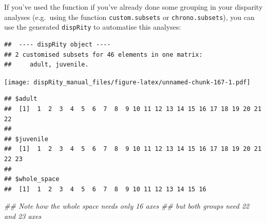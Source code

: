 \documentclass[
]{book}
\newenvironment{Shaded}{\begin{snugshade}}{\end{snugshade}}
\newcommand{\CommentTok}[1]{\textcolor[rgb]{0.56,0.35,0.01}{\textit{#1}}}
\newcommand{\KeywordTok}[1]{\textcolor[rgb]{0.13,0.29,0.53}{\textbf{#1}}}
\newcommand{\NormalTok}[1]{#1}
\newcommand{\OperatorTok}[1]{\textcolor[rgb]{0.81,0.36,0.00}{\textbf{#1}}}
\newcommand{\StringTok}[1]{\textcolor[rgb]{0.31,0.60,0.02}{#1}}
\begin{document}
If you've used the function if you've already done some grouping in your disparity analyses (e.g.~using the function \texttt{custom.subsets} or \texttt{chrono.subsets}), you can use the generated \texttt{dispRity} to automatise this analyses:

\begin{Shaded}
\end{Shaded}

\begin{verbatim}
##  ---- dispRity object ---- 
## 2 customised subsets for 46 elements in one matrix:
##     adult, juvenile.
\end{verbatim}

\begin{Shaded}
\end{Shaded}

\texttt{[image: dispRity\_manual\_files/figure-latex/unnamed-chunk-167-1.pdf]}

\begin{Shaded}
\end{Shaded}

\begin{verbatim}
## $adult
##  [1]  1  2  3  4  5  6  7  8  9 10 11 12 13 14 15 16 17 18 19 20 21 22
## 
## $juvenile
##  [1]  1  2  3  4  5  6  7  8  9 10 11 12 13 14 15 16 17 18 19 20 21 22 23
## 
## $whole_space
##  [1]  1  2  3  4  5  6  7  8  9 10 11 12 13 14 15 16
\end{verbatim}

\begin{Shaded}
\begin{Highlighting}[]
\CommentTok{\#\# Note how the whole space needs only 16 axes}
\CommentTok{\#\# but both groups need 22 and 23 axes}
\end{Highlighting}
\end{Shaded}
\end{document}
